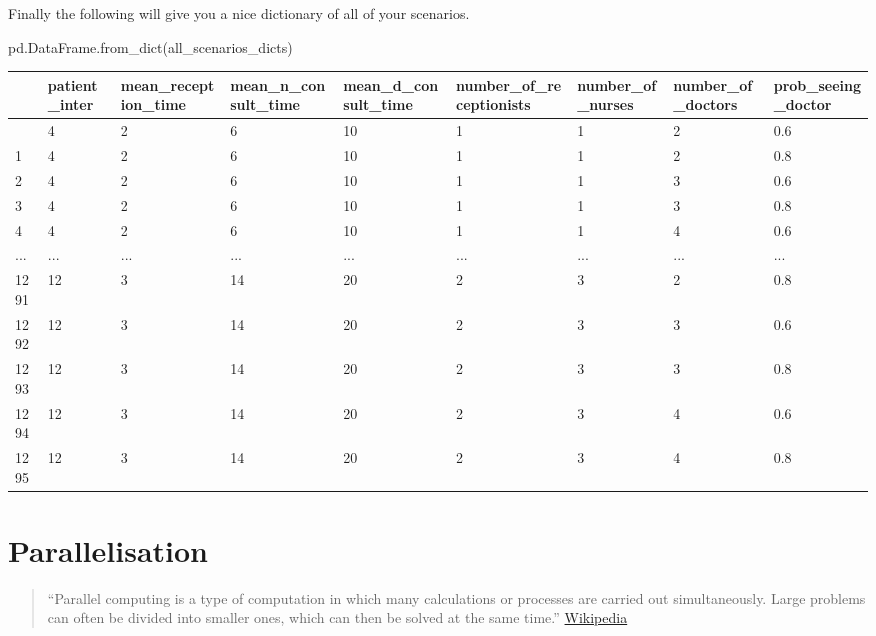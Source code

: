 \documentclass[
  letterpaper,
  DIV=11,
  numbers=noendperiod]{scrreprt}
\newenvironment{Shaded}{\begin{snugshade}}{\end{snugshade}}
\newcommand{\NormalTok}[1]{\textcolor[rgb]{0.00,0.23,0.31}{#1}}
\begin{document}
Finally the following will give you a nice dictionary of all of your
scenarios.

\begin{Shaded}
\begin{Highlighting}[]
\NormalTok{pd.DataFrame.from\_dict(all\_scenarios\_dicts)}
\end{Highlighting}
\end{Shaded}

\begin{longtable}[]{@{}lllllllll@{}}
\toprule\noalign{}
& patient\_inter & mean\_reception\_time & mean\_n\_consult\_time &
mean\_d\_consult\_time & number\_of\_receptionists & number\_of\_nurses
& number\_of\_doctors & prob\_seeing\_doctor \\
\midrule\noalign{}
\endhead
\bottomrule\noalign{}
\endlastfoot
0 & 4 & 2 & 6 & 10 & 1 & 1 & 2 & 0.6 \\
1 & 4 & 2 & 6 & 10 & 1 & 1 & 2 & 0.8 \\
2 & 4 & 2 & 6 & 10 & 1 & 1 & 3 & 0.6 \\
3 & 4 & 2 & 6 & 10 & 1 & 1 & 3 & 0.8 \\
4 & 4 & 2 & 6 & 10 & 1 & 1 & 4 & 0.6 \\
... & ... & ... & ... & ... & ... & ... & ... & ... \\
1291 & 12 & 3 & 14 & 20 & 2 & 3 & 2 & 0.8 \\
1292 & 12 & 3 & 14 & 20 & 2 & 3 & 3 & 0.6 \\
1293 & 12 & 3 & 14 & 20 & 2 & 3 & 3 & 0.8 \\
1294 & 12 & 3 & 14 & 20 & 2 & 3 & 4 & 0.6 \\
1295 & 12 & 3 & 14 & 20 & 2 & 3 & 4 & 0.8 \\
\end{longtable}

\chapter{Parallelisation}\label{parallelisation}

\begin{quote}
``Parallel computing is a type of computation in which many calculations
or processes are carried out simultaneously. Large problems can often be
divided into smaller ones, which can then be solved at the same time.''
\href{https://en.wikipedia.org/wiki/Parallel_computing}{Wikipedia}
\end{quote}
\end{document}
